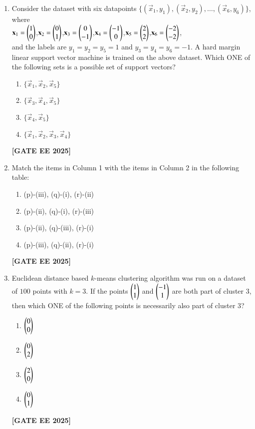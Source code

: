 \documentclass[journal]{IEEEtran}
\newcommand{\qfooter}{%
  \begin{flushright}\footnotesize\textbf{[GATE EE 2025]}\end{flushright}\vspace{1em}%
}
\begin{document}
\begin{enumerate}
\item Consider the dataset with six datapoints $\{(\vec{x}_1, y_1), (\vec{x}_2, y_2), \ldots, (\vec{x}_6, y_6)\}$, where\\
$\mathbf{x}_1 = \begin{pmatrix}1\\0\end{pmatrix}$,\quad $\mathbf{x}_2 = \begin{pmatrix}0\\1\end{pmatrix}$,\quad $\mathbf{x}_3 = \begin{pmatrix}0\\-1\end{pmatrix}$,\quad $\mathbf{x}_4 = \begin{pmatrix}-1\\0\end{pmatrix}$,\quad $\mathbf{x}_5 = \begin{pmatrix}2\\2\end{pmatrix}$,\quad $\mathbf{x}_6 = \begin{pmatrix}-2\\-2\end{pmatrix}$,\\
and the labels are $y_1 = y_2 = y_5 = 1$ and $y_3 = y_4 = y_6 = -1$. A hard margin linear support vector machine is trained on the above dataset. Which ONE of the following sets is a possible set of support vectors?
\begin{multicols}{2}
\begin{enumerate}
\item $\{\vec{x}_1, \vec{x}_2, \vec{x}_5\}$
\item $\{\vec{x}_3, \vec{x}_4, \vec{x}_5\}$
\item $\{\vec{x}_4, \vec{x}_5\}$
\item $\{\vec{x}_1, \vec{x}_2, \vec{x}_3, \vec{x}_4\}$
\end{enumerate} \qfooter
\end{multicols}

\item Match the items in Column 1 with the items in Column 2 in the following table:

\begin{multicols}{2}
\begin{enumerate}
\item (p)-(iii), (q)-(i), (r)-(ii)
\item (p)-(ii), (q)-(i), (r)-(iii)
\item (p)-(ii), (q)-(iii), (r)-(i)
\item (p)-(iii), (q)-(ii), (r)-(i)
\end{enumerate}
\qfooter
\end{multicols}

\item Euclidean distance based $k$-means clustering algorithm was run on a dataset of $100$ points with $k=3$. If the points $\begin{pmatrix}1\\1\end{pmatrix}$ and $\begin{pmatrix}-1\\1\end{pmatrix}$ are both part of cluster 3, then which ONE of the following points is necessarily also part of cluster 3?
\begin{multicols}{4}
\begin{enumerate}
\item $\begin{pmatrix}0\\0\end{pmatrix}$
\item $\begin{pmatrix}0\\2\end{pmatrix}$
\item $\begin{pmatrix}2\\0\end{pmatrix}$
\item $\begin{pmatrix}0\\1\end{pmatrix}$
\end{enumerate} 
\qfooter
\end{multicols}


\end{enumerate}
\end{document}
